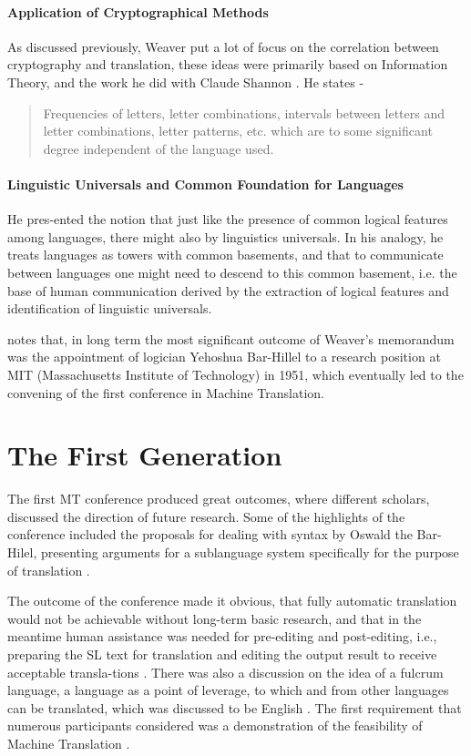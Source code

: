 \paragraph{Application of Cryptographical Methods} As discussed previously, Weaver put a lot of focus on the correlation between cryptography and translation, these ideas were primarily based on Information Theory, and the work he did with Claude Shannon \cite{hutchins1999warren}. He states -

\begin{quote}
    Frequencies of letters, letter combinations, intervals between letters and letter combinations, letter patterns, etc. which are to some significant degree independent of the language used.
\end{quote}

\paragraph{Linguistic Universals and Common Foundation for Languages} He pres-ented the notion that just like the presence of common logical features among languages, there might also by linguistics universals. In his analogy, he treats languages as towers with common basements, and that to communicate between languages one might need to descend to this common basement, i.e. the base of human communication derived by the extraction of logical features and identification of linguistic universals.

\cite{hutchins1999warren} notes that, in long term the most significant outcome of Weaver's memorandum was the appointment of logician Yehoshua Bar-Hillel to a research position at MIT (Massachusetts Institute of Technology) in 1951, which eventually led to the convening of the first conference in Machine Translation.

\section{The First Generation}

The first MT conference produced great outcomes, where different scholars, discussed the direction of future research. Some of the highlights of the conference included the proposals for dealing with syntax by Oswald the Bar-Hilel, presenting arguments for a sublanguage system specifically for the purpose of translation \cite{hutchins1995machine}. 

The outcome of the conference made it obvious, that fully automatic translation would not be achievable without long-term basic research, and that in the meantime human assistance was needed for pre-editing and post-editing, i.e., preparing the SL text for translation and editing the output result to receive acceptable transla-tions \cite{reifler1952first}. There was also a discussion on the idea of a fulcrum language, a language as a point of leverage, to which and from other languages can be translated, which was discussed to be English \cite{reifler1952first}. The first requirement that numerous participants considered was a demonstration of the feasibility of Machine Translation \cite{hutchins1995machine}.

